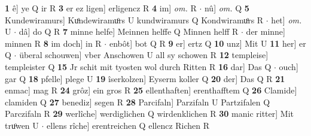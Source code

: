 \documentclass[8pt,a4paper,notitlepage]{article}
\begin{document}
\begin{table}[ht]
\begin{minipage}[t]{0.5\linewidth}
\textbf{1} ê] ye Q ir R \textbf{3} er ez ligen] erligencz R \textbf{4} im] \textit{om.} R  $\cdot$ nû] \textit{om.} Q \textbf{5} Kundewiramurs] Kuͦndewiramuͦrs U kundwiramurs Q Kondwiramuͦrs R  $\cdot$ het] \textit{om.} U  $\cdot$ dâ] do Q R \textbf{7} minne helfe] Meinnen helffe Q Minnen helff R  $\cdot$ der minne] minnen R \textbf{8} im doch] in R  $\cdot$ enbôt] bot Q R \textbf{9} er] ertz Q \textbf{10} unz] Mit U \textbf{11} her] er Q  $\cdot$ überal schouwen] vber Anschowen U all sy schowen R \textbf{12} templeise] templeister Q \textbf{15} Jr schit mit tyosten wol durch Ritten R \textbf{16} dar] Das Q  $\cdot$ ouch] gar Q \textbf{18} pfelle] plege U \textbf{19} îserkolzen] Eyserm koller Q \textbf{20} der] Das Q R \textbf{21} enmac] mag R \textbf{24} grôz] ein gros R \textbf{25} ellenthaften] erenthafftem Q \textbf{26} Clamide] clamiden Q \textbf{27} benediz] segen R \textbf{28} Parcifaln] Parzifaln U Partzifalen Q Parczifaln R \textbf{29} werlîche] werdiglichen Q wirdenklichen R \textbf{30} manic ritter] Mit truͦwen U  $\cdot$ ellens rîche] erentreichen Q ellencz Richen R \newline
\end{minipage}
\end{table}
\end{document}
